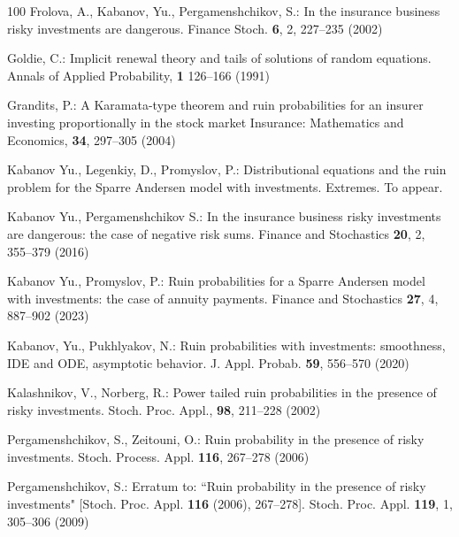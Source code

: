 \begin{thebibliography}{100}
Frolova, A., Kabanov, Yu., Pergamenshchikov, S.: In the insurance business risky investments are dangerous. Finance Stoch. {\bf 6}, 2, 227--235 (2002)

Goldie, C.: 
Implicit renewal theory and tails of solutions of random equations.
Annals of Applied Probability,
{\bf 1}
126--166 (1991)

Grandits, P.: 
A Karamata-type theorem and ruin probabilities for an insurer investing proportionally in the stock market
Insurance: Mathematics and Economics,
{\bf 34}, 297--305 (2004)

Kabanov Yu., Legenkiy, D., Promyslov, P.: Distributional equations and the ruin problem for the Sparre
Andersen model with investments. Extremes. To appear. 

Kabanov Yu., Pergamenshchikov S.: In the insurance business risky investments are dangerous: the case of negative risk sums. Finance and Stochastics {\bf 20}, 2, 355--379 (2016)

Kabanov Yu., Promyslov, P.: 
Ruin probabilities for a Sparre Andersen model with investments: the case of annuity payments.
Finance and Stochastics
{\bf 27}, 4, 887--902 (2023)

Kabanov, Yu., Pukhlyakov, N.: Ruin probabilities with investments:
smoothness, IDE and ODE, asymptotic behavior. J. Appl. Probab. {\bf 59}, 556--570 (2020) 

Kalashnikov, V., Norberg, R.: Power tailed ruin
probabilities in the presence of risky investments. Stoch. Proc. Appl., {\bf 98}, 211--228 (2002)

 Pergamenshchikov, S., Zeitouni, O.: Ruin probability in the presence of risky investments. Stoch. Process. Appl. {\bf 116}, 267--278 (2006)

Pergamenshchikov, S.: Erratum to: ``Ruin probability in the presence of risky investments" [Stoch.
Proc. Appl. {\bf 116} (2006), 267--278]. Stoch.
Proc. Appl. {\bf 119}, 1, 305--306 (2009)

\end{thebibliography} 


